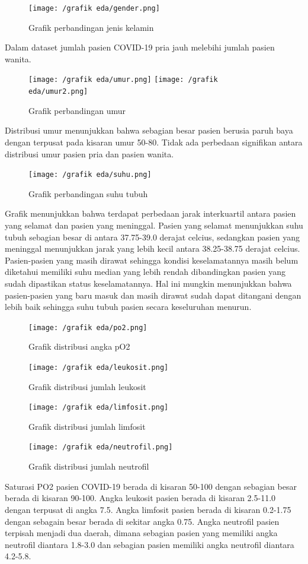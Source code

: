 \documentclass{article}
\begin{document}
	    \begin{figure}[H]
	    	\centering
	    	\texttt{[image: /grafik eda/gender.png]}
	    	\caption{Grafik perbandingan jenis kelamin}
	    \end{figure}
    	\par Dalam dataset jumlah pasien COVID-19 pria jauh melebihi jumlah pasien wanita.
    	
		\begin{figure}[H]
			\centering
			\texttt{[image: /grafik eda/umur.png]}
			\texttt{[image: /grafik eda/umur2.png]}
			\caption{Grafik perbandingan umur}
		\end{figure}
		\par Distribusi umur menunjukkan bahwa sebagian besar pasien berusia paruh baya dengan terpusat pada kisaran umur 50-80. Tidak ada perbedaan signifikan antara distribusi umur pasien pria dan pasien wanita.
		
		\begin{figure}[H]
			\centering
			\texttt{[image: /grafik eda/suhu.png]}
			\caption{Grafik perbandingan suhu tubuh}
		\end{figure}
		\par Grafik menunjukkan bahwa terdapat perbedaan jarak interkuartil antara pasien yang selamat dan pasien yang meninggal. Pasien yang selamat menunjukkan suhu tubuh sebagian besar di antara 37.75-39.0 derajat celcius, sedangkan pasien yang meninggal menunjukkan jarak yang lebih kecil antara 38.25-38.75 derajat celcius. Pasien-pasien yang masih dirawat sehingga kondisi keselamatannya masih belum diketahui memiliki suhu median yang lebih rendah dibandingkan pasien yang sudah dipastikan status keselamatannya. Hal ini mungkin menunjukkan bahwa pasien-pasien yang baru masuk dan masih dirawat sudah dapat ditangani dengan lebih baik sehingga suhu tubuh pasien secara keseluruhan menurun.
		
		\begin{figure}[H]
			\centering
			\texttt{[image: /grafik eda/po2.png]}
			\caption{Grafik distribusi angka pO2}
			\texttt{[image: /grafik eda/leukosit.png]}
			\caption{Grafik distribusi jumlah leukosit}
			\texttt{[image: /grafik eda/limfosit.png]}
			\caption{Grafik distribusi jumlah limfosit}
			\texttt{[image: /grafik eda/neutrofil.png]}
			\caption{Grafik distribusi jumlah neutrofil}
		\end{figure}
		\par Saturasi PO2 pasien COVID-19 berada di kisaran 50-100 dengan sebagian besar berada di kisaran 90-100. Angka leukosit pasien berada di kisaran 2.5-11.0 dengan terpusat di angka 7.5. Angka limfosit pasien berada di kisaran 0.2-1.75 dengan sebagain besar berada di sekitar angka 0.75. Angka neutrofil pasien terpisah menjadi dua daerah, dimana sebagian pasien yang memiliki angka neutrofil diantara 1.8-3.0 dan sebagian pasien memiliki angka neutrofil diantara 4.2-5.8.
		
\end{document}
